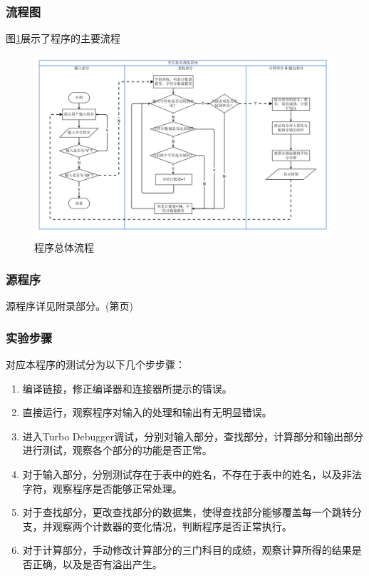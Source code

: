 \documentclass{article}
\begin{document}
	\subsubsection{流程图}
		图\ref{fig:flowchart2}展示了程序的主要流程
		\begin{figure}[h]
			\centering
			\includegraphics[width=1.0\linewidth]{res/homework_1/fig14.png}
			\caption{程序总体流程}
			\label{fig:flowchart2}
		\end{figure}

	\subsubsection{源程序}
	源程序详见附录部分。(第\pageref{code:1_4}页)

	\subsubsection{实验步骤}
		对应本程序的测试分为以下几个步步骤：
		\begin{enumerate}
			\item 编译链接，修正编译器和连接器所提示的错误。
			\item 直接运行，观察程序对输入的处理和输出有无明显错误。
			\item 进入Turbo Debugger调试，分别对输入部分，查找部分，计算部分和输出部分进行测试，观察各个部分的功能是否正常。
			\item 对于输入部分，分别测试存在于表中的姓名，不存在于表中的姓名，以及非法字符，观察程序是否能够正常处理。
			\item 对于查找部分，更改查找部分的数据集，使得查找部分能够覆盖每一个跳转分支，并观察两个计数器的变化情况，判断程序是否正常执行。
			\item 对于计算部分，手动修改计算部分的三门科目的成绩，观察计算所得的结果是否正确，以及是否有溢出产生。
		\end{enumerate}
\end{document}
